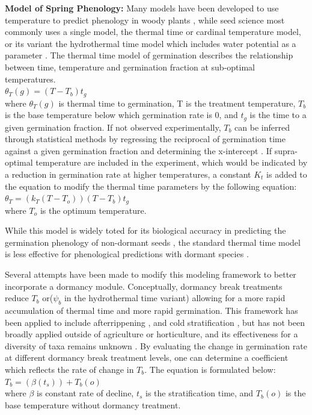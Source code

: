 \documentclass[12pt]{article}\usepackage[]{graphicx}\usepackage[]{color}
\begin{document}
\textbf{Model of Spring Phenology:} Many models have been developed to use temperature to predict phenology in woody plants \citep{Chuine2002}, while seed science most commonly uses a single model, the thermal time or cardinal temperature model, or its variant the hydrothermal time model which includes water potential as a parameter \citep {Bradford2002}. The thermal time model of germination describes the relationship between time, temperature and germination fraction at sub-optimal temperatures.\\
\indent$\theta_{T}(g)=(T-T_{b})t_{g}$\\
where $\theta_{T}(g)$ is thermal time to germination, T is the treatment temperature, $T_b$ is the base temperature below which germination rate is 0, and $t_g$ is the time to a given germination fraction. If not observed experimentally, $T_b$ can be inferred through statistical methods by regressing the reciprocal of germination time against a given germination fraction and determining the x-intercept \citep{Pritchard1999}.
If supra-optimal temperature are included in the experiment, which would be indicated by a reduction in germination rate at higher temperatures, a constant $K_t$ is added to the equation to modify the thermal time parameters by the following equation:\\
\indent$\theta_{T}=(k_{T}(T-T_{o}))(T-T_{b})t_{g}$\\
where $T_o$ is the optimum temperature.
\par While this model is widely toted for its biological accuracy in predicting the germination phenology of non-dormant seeds \citep{Bradford2005}, the standard thermal time model is less effective for phenological predictions with dormant species \citep{Batlla2015}.
\par Several attempts have been made to modify this modeling framework to better incorporate a dormancy module. Conceptually, dormancy break treatments reduce $T_b$ or($\psi_b$ in the hydrothermal time variant) allowing for a more rapid accumulation of thermal time and more rapid germination. This framework has been applied to include afterrippening \citep{Meyer2000}, and cold stratification \citep{Pritchard1996,Batlla2003}, but has not been broadly applied outside of agriculture or horticulture, and its effectiveness for a diversity of taxa remains unknown \citep{Steadman2004}. By evaluating the change in germination rate at different dormancy break treatment levels, one can determine a coefficient which reflects the rate of change in $T_b$. The equation is formulated below:\\
\indent$T_b= (\beta(t_s))+T_b(o)$\\
where $\beta$ is constant rate of decline, $t_s$ is the stratification time, and $T_b(o)$ is the base temperature without dormancy treatment.
\end{document}
